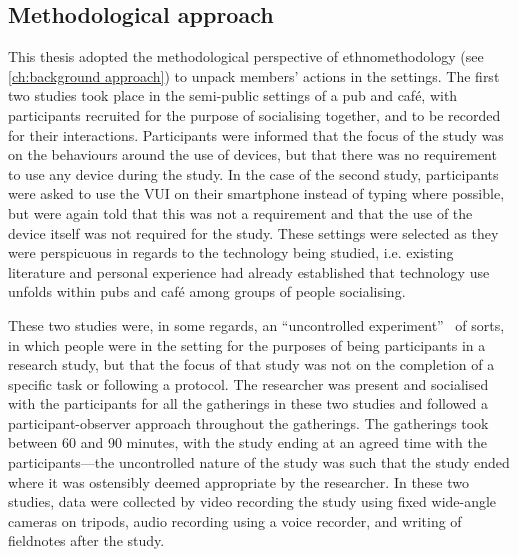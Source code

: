 \subsection{Methodological approach}\label{sec:synopsis conclusions method}
\begin{revisedsubmission}
This thesis adopted the methodological perspective of ethnomethodology (see \autoref{ch:background approach}) to unpack members' actions in the settings.
The first two studies took place in the semi-public settings of a pub and caf\'{e}, with participants recruited for the purpose of socialising together, and to be recorded for their interactions.
Participants were informed that the focus of the study was on the behaviours around the use of devices, but that there was no requirement to use any device during the study.
In the case of the second study, participants were asked to use the \ac{VUI} on their smartphone instead of typing where possible, but were again told that this was not a requirement and that the use of the device itself was not required for the study.
These settings were selected as they were perspicuous in regards to the technology being studied, i.e. existing literature and personal experience had already established that technology use unfolds within pubs and caf\'{e} among groups of people socialising.

These two studies were, in some regards, an ``uncontrolled experiment''~\citep[p. 114]{Suchman1985} of sorts, in which people were in the setting for the purposes of being participants in a research study, but that the focus of that study was not on the completion of a specific task or following a protocol.
The researcher was present and socialised with the participants for all the gatherings in these two studies and followed a participant-observer approach throughout the gatherings.
The gatherings took between 60 and 90 minutes, with the study ending at an agreed time with the participants---the uncontrolled nature of the study was such that the study ended where it was ostensibly deemed appropriate by the researcher.
In these two studies, data were collected by video recording the study using fixed wide-angle cameras on tripods, audio recording using a voice recorder, and writing of fieldnotes after the study.


\end{revisedsubmission}
